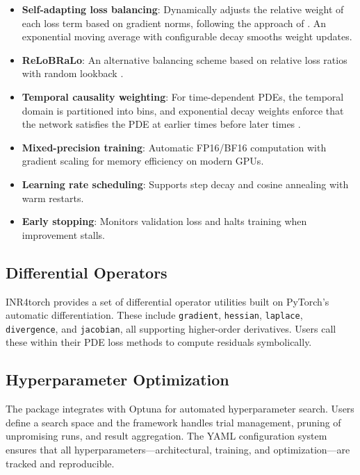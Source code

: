 \documentclass[11pt,a4paper]{article}
\begin{document}
\begin{itemize}
    \item \textbf{Self-adapting loss balancing}: Dynamically adjusts the relative weight of each loss term based on gradient norms, following the approach of \citet{mcclenny2020self}. An exponential moving average with configurable decay smooths weight updates.
    \item \textbf{ReLoBRaLo}: An alternative balancing scheme based on relative loss ratios with random lookback \citep{bischof2021multi}.
    \item \textbf{Temporal causality weighting}: For time-dependent PDEs, the temporal domain is partitioned into bins, and exponential decay weights enforce that the network satisfies the PDE at earlier times before later times \citep{wang2024respecting}.
    \item \textbf{Mixed-precision training}: Automatic FP16/BF16 computation with gradient scaling for memory efficiency on modern GPUs.
    \item \textbf{Learning rate scheduling}: Supports step decay and cosine annealing with warm restarts.
    \item \textbf{Early stopping}: Monitors validation loss and halts training when improvement stalls.
\end{itemize}

\subsection{Differential Operators}

INR4torch provides a set of differential operator utilities built on PyTorch's automatic differentiation. These include \texttt{gradient}, \texttt{hessian}, \texttt{laplace}, \texttt{divergence}, and \texttt{jacobian}, all supporting higher-order derivatives. Users call these within their PDE loss methods to compute residuals symbolically.

\subsection{Hyperparameter Optimization}

The package integrates with Optuna \citep{akiba2019optuna} for automated hyperparameter search. Users define a search space and the framework handles trial management, pruning of unpromising runs, and result aggregation. The YAML configuration system ensures that all hyperparameters---architectural, training, and optimization---are tracked and reproducible.
\end{document}
